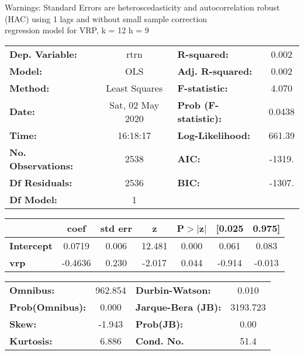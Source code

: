 Warnings: \newline
 [1] Standard Errors are heteroscedasticity and autocorrelation robust (HAC) using 1 lags and without small sample correction\\ 

regression model for VRP, k = 12 h = 9\begin{center}
\begin{tabular}{lclc}
\toprule
\textbf{Dep. Variable:}    &       rtrn       & \textbf{  R-squared:         } &     0.002   \\
\textbf{Model:}            &       OLS        & \textbf{  Adj. R-squared:    } &     0.002   \\
\textbf{Method:}           &  Least Squares   & \textbf{  F-statistic:       } &     4.070   \\
\textbf{Date:}             & Sat, 02 May 2020 & \textbf{  Prob (F-statistic):} &   0.0438    \\
\textbf{Time:}             &     16:18:17     & \textbf{  Log-Likelihood:    } &    661.39   \\
\textbf{No. Observations:} &        2538      & \textbf{  AIC:               } &    -1319.   \\
\textbf{Df Residuals:}     &        2536      & \textbf{  BIC:               } &    -1307.   \\
\textbf{Df Model:}         &           1      & \textbf{                     } &             \\
\bottomrule
\end{tabular}
\begin{tabular}{lcccccc}
                   & \textbf{coef} & \textbf{std err} & \textbf{z} & \textbf{P$> |$z$|$} & \textbf{[0.025} & \textbf{0.975]}  \\
\midrule
\textbf{Intercept} &       0.0719  &        0.006     &    12.481  &         0.000        &        0.061    &        0.083     \\
\textbf{vrp}       &      -0.4636  &        0.230     &    -2.017  &         0.044        &       -0.914    &       -0.013     \\
\bottomrule
\end{tabular}
\begin{tabular}{lclc}
\textbf{Omnibus:}       & 962.854 & \textbf{  Durbin-Watson:     } &    0.010  \\
\textbf{Prob(Omnibus):} &   0.000 & \textbf{  Jarque-Bera (JB):  } & 3193.723  \\
\textbf{Skew:}          &  -1.943 & \textbf{  Prob(JB):          } &     0.00  \\
\textbf{Kurtosis:}      &   6.886 & \textbf{  Cond. No.          } &     51.4  \\
\bottomrule
\end{tabular}
\end{center}

